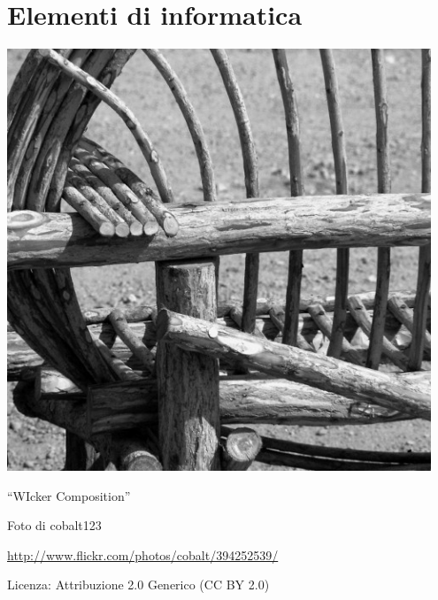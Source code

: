 
\part{Elementi di informatica}
\includegraphics[width=0.95\textwidth]{img/wiccom.jpg}
  \begin{center}
    {\large ``WIcker Composition''}\par
    Foto di cobalt123\par
    \url{http://www.flickr.com/photos/cobalt/394252539/}\par
    Licenza: Attribuzione 2.0 Generico (CC BY 2.0)\par
  \end{center}
\clearpage
\cleardoublepage